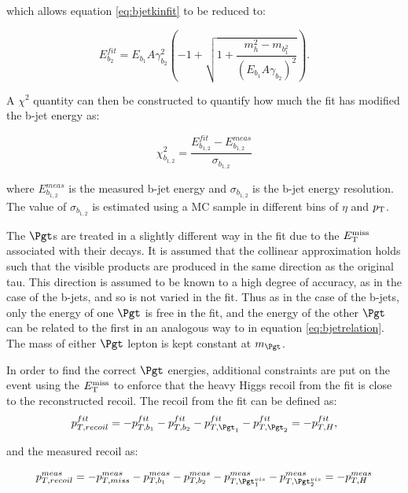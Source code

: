 which allows equation \ref{eq:bjetkinfit} to be reduced to:

\begin{equation}
E_{b_{2}}^{fit} = E_{b_{1}}A\gamma_{b_{2}}^{2}\left(-1 + \sqrt{1 +
\frac{m_{h}^{2} -
m_{b_{1}^{2}}}{\left(E_{b_{1}}A\gamma_{b_{2}}\right)^{2}}}\right) .
\label{eq:bjetrelation}
\end{equation}

A $\chi^{2}$ quantity can then be constructed to quantify how much the fit has
modified the b-jet energy as:

\begin{equation}
\chi_{b_{1,2}}^{2} = \frac{E_{b_{1,2}}^{fit} -
E_{b_{1,2}}^{meas}}{\sigma_{b_{1,2}}}
\end{equation}

where $E_{b_{1,2}}^{meas}$ is the measured b-jet energy and $\sigma_{b_{1,2}}$
is the b-jet energy resolution. The value of $\sigma_{b_{1,2}}$ is estimated
using a \ac{MC} sample in different bins of $\eta$ and $p_{\mathrm{T}}$. 

The $\Pgt$s are treated in a slightly different way in the fit due to the $E_{\mathrm{T}}^{\text{miss}}$
associated with their decays. It is assumed that the collinear approximation
holds such that the visible products are produced in the same direction as the
original tau. This direction is assumed to be known to a high degree of
accuracy, as in the case of the b-jets, and so is not varied in the fit. Thus as
in the case of the b-jets, only the energy of one $\Pgt$ is free in the fit, and
the energy of the other $\Pgt$ can be related to the first in an analogous way
to in equation \ref{eq:bjetrelation}. The mass of either $\Pgt$ lepton is kept
constant at $m_{\Pgt}$.  

In order to find the correct $\Pgt$ energies, additional constraints are put on
the event using the $E_{\mathrm{T}}^{\text{miss}}$ to enforce that the heavy Higgs recoil from the fit
is close to the reconstructed recoil. The recoil from the fit can be defined as:
\begin{equation}
p_{T,recoil}^{fit} = - p_{T,b_{1}}^{fit} - p_{T,b_{2}}^{fit} -
p_{T,\Pgt_{1}}^{fit} - p_{T,\Pgt_{2}}^{fit} = - p_{T,H}^{fit} ,
\end{equation}

and the measured recoil as:

\begin{equation}
p_{T,recoil}^{meas} = - p_{T,miss}^{meas} - p_{T,b_{1}}^{meas} - p_{T,b_{2}}^{meas} -
p_{T,\Pgt_{1}^{vis}}^{meas} - p_{T,\Pgt_{2}^{vis}}^{meas} = - p_{T,H}^{meas}
\end{equation}

